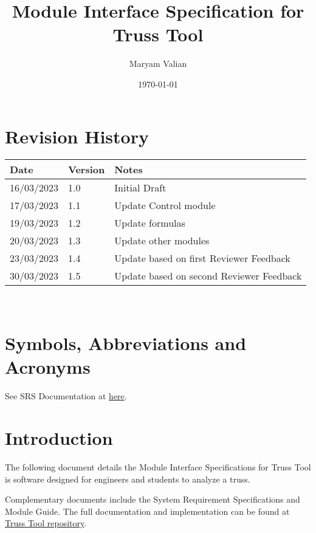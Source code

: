 \documentclass[12pt, titlepage]{article}
\begin{document}
\title{Module Interface Specification for Truss Tool}

\author{Maryam Valian}

\date{\today}

\maketitle


\section{Revision History}

\begin{tabularx}{\textwidth}{p{3cm}p{2cm}X}
\toprule {\bf Date} & {\bf Version} & {\bf Notes}\\
\midrule
16/03/2023 & 1.0 & Initial Draft\\
17/03/2023 & 1.1 & Update Control module\\
19/03/2023 & 1.2 & Update formulas\\
20/03/2023 & 1.3 & Update other modules\\
23/03/2023 & 1.4 & Update based on first Reviewer Feedback\\
30/03/2023 & 1.5 & Update based on second Reviewer Feedback\\
\bottomrule
\end{tabularx}

~\newpage

\section{Symbols, Abbreviations and Acronyms}

See SRS Documentation at \href{https://github.com/Maryamvalian/project741/blob/main/docs/SRS/SRS.pdf}{here}. 
\newpage

\tableofcontents

\newpage


\section{Introduction}

The following document details the Module Interface Specifications for
Truss Tool is software designed for engineers and students to analyze a truss.

Complementary documents include the System Requirement Specifications
and Module Guide.  The full documentation and implementation can be
found at \href{https://github.com/Maryamvalian/project741}{Truss Tool repository}.
\end{document}
